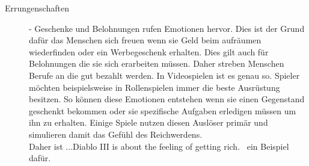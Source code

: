 \begin{description}
\item[Errungenschaften] - Geschenke und Belohnungen rufen Emotionen hervor. Dies ist der Grund dafür das Menschen sich freuen wenn sie Geld beim aufräumen wiederfinden oder ein Werbegeschenk erhalten. Dies gilt auch für Belohnungen die sie sich erarbeiten müssen. Daher streben Menschen Berufe an die gut bezahlt werden. In Videospielen ist es genau so. Spieler möchten beispielsweise in Rollenspielen immer die beste Ausrüstung besitzen. So können diese Emotionen entstehen wenn sie einen Gegenstand geschenkt bekommen oder sie spezifische Aufgaben erledigen müssen um ihn zu erhalten. Einige Spiele nutzen diesen Auslöser primär und simulieren damit das Gefühl des Reichwerdens. \cite[S. 24]{Adams:1515529} \\ 
Daher ist \glqq ...Diablo III is about the feeling of getting rich.\grqq\ \cite[S. 24]{Adams:1515529} ein Beispiel dafür. %
%
%
%
%

\end{description}
